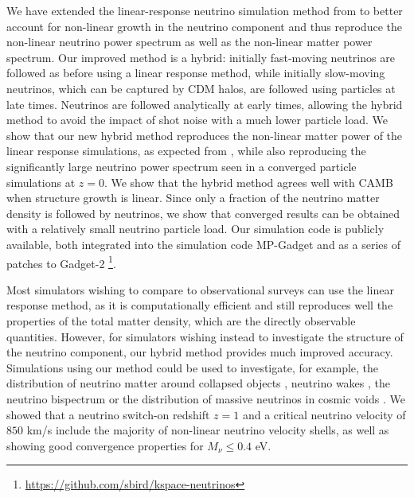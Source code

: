 \documentclass[useAMS, usenatbib]{mnras}
\begin{document}
We have extended the linear-response neutrino simulation method from \cite{AHB} to better account for non-linear growth in the neutrino component and thus reproduce the non-linear neutrino power spectrum as well as the non-linear matter power spectrum.
Our improved method is a hybrid: initially fast-moving neutrinos are followed as before using a linear response method, while initially slow-moving neutrinos, which can be captured by CDM halos, are followed using particles at late times. Neutrinos are followed analytically at early times, allowing the hybrid method to avoid the impact of shot noise with a much lower particle load. We show that our new hybrid method reproduces the non-linear matter power of the linear response simulations, as expected from \cite{AHB}, while also reproducing the significantly large neutrino power spectrum seen in a converged particle simulations at $z=0$. We show that the hybrid method agrees well with CAMB when structure growth is linear. Since only a fraction of the neutrino matter density is followed by neutrinos, we show that converged results can be obtained with a relatively small neutrino particle load. Our simulation code is publicly available, both integrated into the simulation code MP-Gadget and as a series of patches to Gadget-2 \footnote{\url{https://github.com/sbird/kspace-neutrinos}}.


Most simulators wishing to compare to observational surveys can use the linear response method, as it is computationally efficient and still reproduces well the properties of the total matter density, which are the directly observable quantities. However, for simulators wishing instead to investigate the structure of the neutrino component, our hybrid method provides much improved accuracy. Simulations using our method could be used to investigate, for example, the distribution of neutrino matter around collapsed objects \citep{FVN_2013}, neutrino wakes \citep{Inman_2015}, the neutrino bispectrum \citep{Furhrer_2015} or the distribution of massive neutrinos in cosmic voids \citep{Banerjee_2016}. We showed that a neutrino switch-on redshift $z=1$ and a critical neutrino velocity of $850$ km/s include the majority of non-linear neutrino velocity shells, as well as showing good convergence properties for $M_\nu \leq 0.4$ eV.
\end{document}
